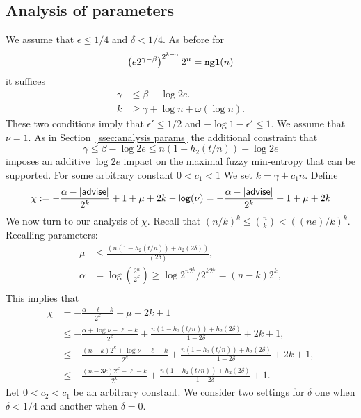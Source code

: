 \subsection{Analysis of parameters}
We assume that $\epsilon\le 1/4$ and $\delta<1/4$.  As before for  
\[
\left(e2^{\gamma-\beta}\right)^{2^{k-\gamma}}2^n = \mathtt{ngl}(n)\]  it suffices 
\begin{align*}
 \gamma &\le \beta -\log{2e}.\\
k &\ge \gamma + \log{n+ \omega(\log{n})}.
\end{align*}
These two conditions imply that $\epsilon'\le 1/2$ and $-\log{1-\epsilon'}\le 1$.
We assume that $\nu = 1$.
As in Section~\ref{ssec:analysis params} the additional constraint that 
\[
\gamma \le \beta - \log{2e}
\le n(1-h_2(t/n)) - \log{2e}\] imposes an additive $\log{2e}$ impact on the maximal fuzzy min-entropy that can be supported. 
For some arbitrary constant $0<c_1 < 1$ We set $k = \gamma + c_1n$. 
Define \[\chi: =-\frac{\alpha-|{\mathsf{advise}}|}{2^k}+1+\mu+2k-\mathsf{log}\!\left(\nu\right)=-\frac{\alpha-|{\mathsf{advise}}|}{2^k}+1+\mu+2k\]
We now turn to our analysis of $\chi$.  Recall that $(n/k)^k \le {n\choose k} < ((ne)/k)^k$.  Recalling parameters: 
\begin{align*}
\mu&\le \frac{(n(1-h_2(t/n)) +h_2(2\delta))}{(2\delta)},\\
\alpha &= \log{2^n\choose 2^k} \ge \log{2^{n2^k} /2^{k2^k}} = (n-k)2^k,\\
\end{align*}
This implies that 
\begin{align*}
\chi&= -\frac{\alpha-\ell-k}{2^k} + \mu +2k+1\\
&\le  -\frac{\alpha +\log{\nu}-\ell-k}{2^k} +\frac{n(1-h_2(t/n)) +h_2(2\delta)}{1-2\delta}  + 2k+1,\\
&\le - \frac{(n-k)2^k +\log{\nu}-\ell-k}{2^k} +\frac{n(1-h_2(t/n)) +h_2(2\delta)}{1-2\delta} + 2k+1,\\
&\le  -\frac{(n-3k)2^k-\ell-k}{2^k} + \frac{n(1-h_2(t/n)) +h_2(2\delta)}{1-2\delta}+1.
\end{align*}
Let $0<c_2<c_1$ be an arbitrary constant. We consider two settings for $\delta$ one when $\delta<1/4$ and another when $\delta=0$.

